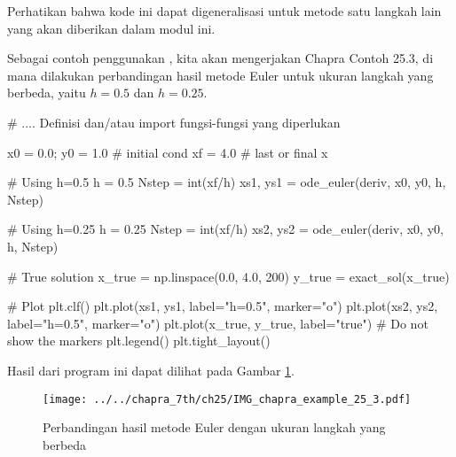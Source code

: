 Perhatikan bahwa kode ini dapat digeneralisasi untuk metode satu langkah lain yang akan
diberikan dalam modul ini.

Sebagai contoh penggunakan , kita akan mengerjakan Chapra Contoh 25.3,
di mana dilakukan perbandingan hasil metode Euler untuk ukuran langkah yang berbeda, yaitu
$h=0.5$ dan $h=0.25$.
\begin{pythoncode}
# .... Definisi dan/atau import fungsi-fungsi yang diperlukan

x0 = 0.0; y0 = 1.0 # initial cond
xf = 4.0 # last or final x

# Using h=0.5
h = 0.5
Nstep = int(xf/h)
xs1, ys1 = ode_euler(deriv, x0, y0, h, Nstep)

# Using h=0.25
h = 0.25
Nstep = int(xf/h)
xs2, ys2 = ode_euler(deriv, x0, y0, h, Nstep)

# True solution
x_true = np.linspace(0.0, 4.0, 200)
y_true = exact_sol(x_true)

# Plot
plt.clf()
plt.plot(xs1, ys1, label="h=0.5", marker="o")
plt.plot(xs2, ys2, label="h=0.5", marker="o")
plt.plot(x_true, y_true, label="true") # Do not show the markers
plt.legend()
plt.tight_layout()
\end{pythoncode}
Hasil dari program ini dapat dilihat pada Gambar \ref{fig:example_25_3}.


\begin{figure}[h]
{\centering
\texttt{[image: ../../chapra\_7th/ch25/IMG\_chapra\_example\_25\_3.pdf]}
\par}
\caption{Perbandingan hasil metode Euler dengan ukuran langkah yang berbeda}
\label{fig:example_25_3}
\end{figure}

